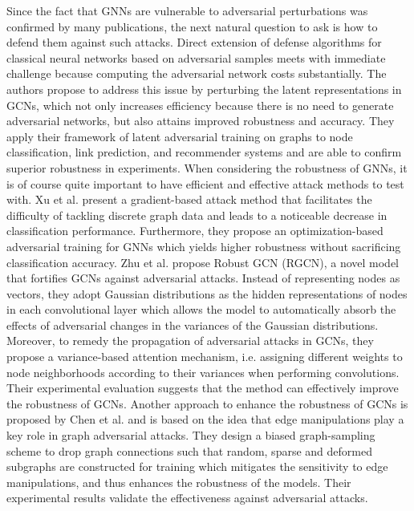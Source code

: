 \documentclass[a4paper,preprint]{sig-alternate}
\begin{document}
Since the fact that GNNs are vulnerable to adversarial perturbations was confirmed by many publications, the next natural question to ask
is how to defend them against such attacks. 
Direct extension of defense algorithms for classical neural networks based on adversarial samples meets with immediate challenge because
computing the adversarial network costs substantially. \cite{Jin2020} The authors propose to address this issue by perturbing the latent 
representations in GCNs, which not only increases efficiency because there is no need to generate adversarial networks, but also attains 
improved robustness and accuracy. They apply their framework of latent adversarial training on graphs to node classification,
link prediction, and recommender systems and are able to confirm superior robustness in experiments.
When considering the robustness of GNNs, it is of course quite important to have efficient and effective attack methods to test with.
Xu et al. \cite{xu2019topology} present a gradient-based attack method that facilitates the difficulty of tackling discrete graph data
and leads to a noticeable decrease in classification performance. Furthermore, they propose an optimization-based adversarial training
for GNNs which yields higher robustness without sacrificing classification accuracy.
Zhu et al. \cite{10.1145/3292500.3330851} propose Robust GCN (RGCN), a novel model that fortifies GCNs against adversarial attacks.
Instead of representing  nodes as vectors, they adopt Gaussian distributions as the hidden representations of nodes in each
convolutional layer which allows the model to automatically absorb the effects of adversarial changes in the variances of the Gaussian distributions.
Moreover, to remedy the propagation of adversarial attacks in GCNs, they propose a variance-based attention mechanism, i.e. assigning different
weights to node neighborhoods according to their variances when performing convolutions. Their experimental evaluation suggests that
the method can effectively improve the robustness of GCNs.\newline
Another approach to enhance the robustness of GCNs is proposed by Chen et al. \cite{Chen2020} and is based on the idea that
edge manipulations play a key role in graph adversarial attacks. They design a biased graph-sampling scheme to drop graph connections
such that random, sparse and deformed subgraphs are constructed for training which mitigates the sensitivity 
to edge manipulations, and thus enhances the robustness of the models. Their experimental results validate the effectiveness 
against adversarial attacks.
\end{document}
